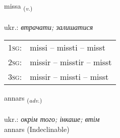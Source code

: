 \documentclass[frontgrid, backgrid]{flacards}\usepackage[]{graphicx}\usepackage[]{xcolor}
\begin{document}
\renewcommand{\flhead}{\vskip5pt \fboxsep=0pt {\small\bfseries\footnotesize Sagnorð | дієслово}}
\renewcommand{\fcfoot}{\vskip5pt \fboxsep=0pt \hspace{2pt}{\small\bfseries\footnotesize 1K}}

\renewcommand{\blhead}{\vskip5pt {\small\bfseries\footnotesize Sagnorð | дієслово }}
\renewcommand{\bcfoot}{\vskip5pt \hspace{2pt}{\small\bfseries\footnotesize 1K}}


{missa \small{\textsubscript{(\textit{v.})}} \\[1ex] %
\textphonetic{[mɪsa]} \\
ukr.: \emph{втрачати; залишатися} \\  [2ex]
\renewcommand*{\arraystretch}{0.8}
\begin{tabular}{p{1cm}l}
\textsc{1sg}: & missi -- missti -- misst \\ 
\textsc{2sg}: & missir -- misstir -- misst \\ 
\textsc{3sg}: & missir -- missti -- misst \\ 
\end{tabular}
}


\renewcommand{\flhead}{\vskip5pt \fboxsep=0pt {\small\bfseries\footnotesize Atviksorð | прислівник}}
\renewcommand{\fcfoot}{\vskip5pt \fboxsep=0pt \hspace{2pt}{\small\bfseries\footnotesize 1K}}

\renewcommand{\blhead}{\vskip5pt {\small\bfseries\footnotesize Atviksorð | прислівник }}
\renewcommand{\bcfoot}{\vskip5pt \hspace{2pt}{\small\bfseries\footnotesize 1K}}


{annars \small{\textsubscript{(\textit{adv.})}} \\[1ex]
\textphonetic{[anar̥s]} \\
ukr.: \emph{окрім того; інкаше; втім} \\  [2ex]
annars (Indeclinable)}
\end{document}
